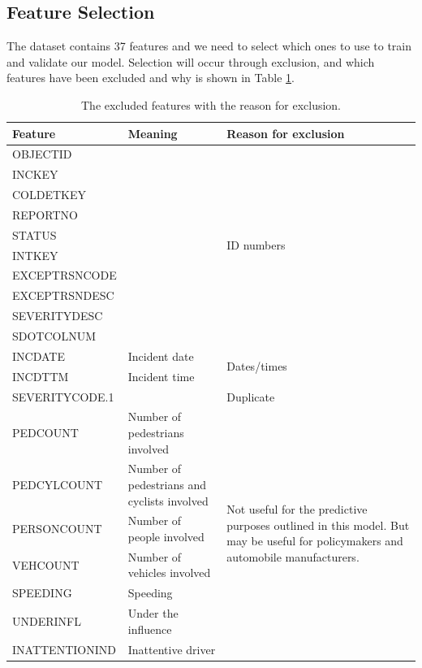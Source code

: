 \documentclass[12pt,a4paper,oneside]{article}
\begin{document}
\subsection{Feature Selection}

The dataset contains 37 features and we need to select which ones to use to train and validate our model. 
Selection will occur through exclusion, and which features have been excluded and why is shown in Table \ref{tbl:feature_exclusion}.

\begin{table}[htbp!]
    \centering
    \caption{The excluded features with the reason for exclusion.}
    \label{tbl:feature_exclusion}
    \begin{tabularx}{\textwidth}{l X X}
        \toprule
        Feature & Meaning & Reason for exclusion \\
        \midrule\midrule
        OBJECTID & & \multirow{10}{=}{ID numbers} \\
        INCKEY & & \\
        COLDETKEY & & \\
        REPORTNO & & \\
        STATUS & & \\
        INTKEY & & \\
        EXCEPTRSNCODE & & \\
        EXCEPTRSNDESC & & \\
        SEVERITYDESC & & \\
        SDOTCOLNUM & & \\
        \midrule
        INCDATE & Incident date & \multirow{2}{=}{Dates/times} \\
        INCDTTM & Incident time& \\
        \midrule
        SEVERITYCODE.1 &  & Duplicate \\
        \midrule
        PEDCOUNT & Number of pedestrians involved & \multirow{18}{=}{Not useful for the predictive purposes outlined in this model. But may be useful for policymakers and automobile manufacturers.} \\
        PEDCYLCOUNT & Number of pedestrians and cyclists involved &  \\
        PERSONCOUNT & Number of people involved &  \\
        VEHCOUNT & Number of vehicles involved &  \\
        SPEEDING & Speeding &  \\
        UNDERINFL & Under the influence &  \\
        INATTENTIONIND & Inattentive driver &  \\

\end{tabularx}
\end{table}
\end{document}

